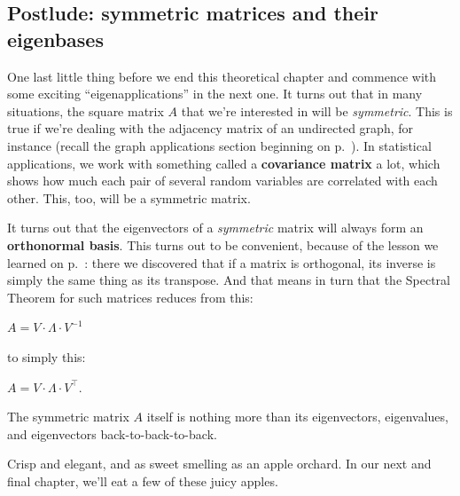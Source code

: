 \subsection{Postlude: symmetric matrices and their eigenbases}


One last little thing before we end this theoretical chapter and commence with
some exciting ``eigenapplications'' in the next one. It turns out that in many
situations, the square matrix $A$ that we're interested in will be
\textit{symmetric}. This is true if we're dealing with the adjacency matrix of
an undirected graph, for instance (recall the graph applications section
beginning on p.~\pageref{sec:graphs}). In statistical applications, we work
with something called a \textbf{covariance matrix} a lot, which shows how much
each pair of several random variables are correlated with each other. This,
too, will be a symmetric matrix.


It turns out that the eigenvectors of a \textit{symmetric} matrix will always
form an \textbf{orthonormal basis}. This turns out to be convenient, because of
the lesson we learned on p.~\pageref{orthoInverseTranspose}: there we
discovered that if a matrix is orthogonal, its inverse is simply the same thing
as its transpose. And that means in turn that the Spectral Theorem for such
matrices reduces from this:

\begin{center}
$A = V\cdot \Lambda \cdot V^{-1}$
\end{center}

to simply this:

\begin{center}
$A = V\cdot \Lambda \cdot V^\intercal$.
\end{center}

The symmetric matrix $A$ itself is nothing more than its eigenvectors,
eigenvalues, and eigenvectors back-to-back-to-back.

Crisp and elegant, and as sweet smelling as an apple orchard. In our next and
final chapter, we'll eat a few of these juicy apples.
